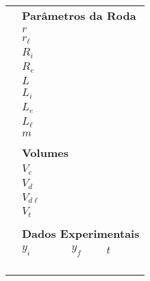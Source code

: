 \begin{table*}[!ht]
    \centering
    \begin{tabular}{lp{25mm}p{25mm}p{25mm}l}
    \toprule
        &\multicolumn{4}{l}{\textbf{Parâmetros da Roda}} \\
        \cmidrule{2-3}
        & $r$ \cellcolor[gray]{0.95} & \cellcolor[gray]{0.97} \\
        & $r_\ell$ \cellcolor[gray]{0.89} & \cellcolor[gray]{0.92} \\
        & $R_i$ \cellcolor[gray]{0.95} & \cellcolor[gray]{0.97} \\
        & $R_e$ \cellcolor[gray]{0.89} & \cellcolor[gray]{0.92} \\
        & $L$ \cellcolor[gray]{0.95} & \cellcolor[gray]{0.97} \\
        & $L_i$ \cellcolor[gray]{0.89} & \cellcolor[gray]{0.92} \\
        & $L_e$ \cellcolor[gray]{0.95} & \cellcolor[gray]{0.97} \\
        & $L_\ell$ \cellcolor[gray]{0.89} & \cellcolor[gray]{0.92} \\
        & $m$ \cellcolor[gray]{0.95} & \cellcolor[gray]{0.97} \\
        \cmidrule{2-3}
        \\
        &\multicolumn{4}{l}{\textbf{Volumes}} \\
        \cmidrule{2-3}
        & $V_e$ \cellcolor[gray]{0.89} & \cellcolor[gray]{0.92} \\
        & $V_d$ \cellcolor[gray]{0.95} & \cellcolor[gray]{0.97} \\
        & $V_{d\ell}$ \cellcolor[gray]{0.89} & \cellcolor[gray]{0.92} \\
        & $V_t$ \cellcolor[gray]{0.95} & \cellcolor[gray]{0.97} \\
        \cmidrule{2-3}
        \\
        &\multicolumn{4}{l}{\textbf{Dados Experimentais}} \\
        \cmidrule{2-4}
        & $y_i$ & $y_f$ & $t$ & \\
        \cmidrule{2-4}
        & \cellcolor[gray]{0.89} & \cellcolor[gray]{0.92} & \cellcolor[gray]{0.89} \\
        & \cellcolor[gray]{0.95} & \cellcolor[gray]{0.97} & \cellcolor[gray]{0.95} \\
        & \cellcolor[gray]{0.89} & \cellcolor[gray]{0.92} & \cellcolor[gray]{0.89} \\
        & \cellcolor[gray]{0.95} & \cellcolor[gray]{0.97} & \cellcolor[gray]{0.95} \\

\end{tabular}
\end{table*}
